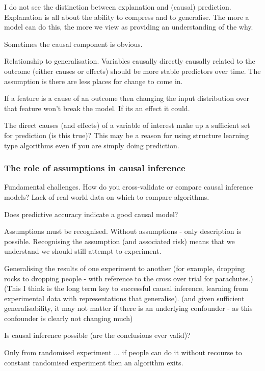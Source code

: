 I do not see the distinction between explanation and (causal) prediction. Explanation is all about the ability to compress and to generalise. The more a model can do this, the more we view as providing an understanding of the why. 


Sometimes the causal component is obvious. 

Relationship to generalisation. Variables causally directly causally related to the outcome (either causes or effects) should be more stable predictors over time. The assumption is there are less places for change to come in. 

If a feature is a cause of an outcome then changing the input distribution over that feature won't break the model. If its an effect it could.

The direct causes (and effects) of a variable of interest make up a sufficient set for prediction (is this true)? This may be a reason for using structure learning type algorithms even if you are simply doing prediction.

\subsubsection*{The role of assumptions in causal inference}

Fundamental challenges. How do you cross-validate or compare causal inference models? Lack of real world data on which to compare algorithms. 

Does predictive accuracy indicate a good causal model?

Assumptions must be recognised. Without assumptions - only description is possible. Recognising the assumption (and associated risk) means that we understand we should still attempt to experiment.

Generalising the results of one experiment to another (for example, dropping rocks to dropping people - with reference to the cross over trial for parachutes.) (This I think is the long term key to successful causal inference, learning from experimental data with representations that generalise). (and given sufficient generalisability, it may not matter if there is an underlying confounder - as this confounder is clearly not changing much)

Is causal inference possible (are the conclusions ever valid)?

Only from randomised experiment ... if people can do it without recourse to constant randomised experiment then an algorithm exits.

